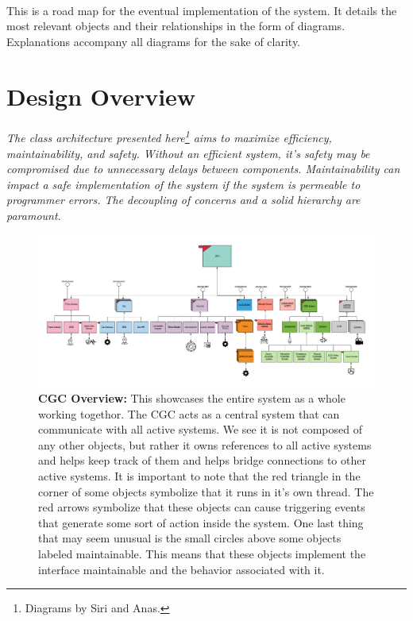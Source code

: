 \documentclass[12pt]{article}
\begin{document}
\paragraph{} This is a road map for the eventual implementation of the system. It details the most 
relevant objects and their relationships in the form of diagrams. Explanations accompany all diagrams 
for the sake of clarity.

\section{Design Overview} \label{over}
\paragraph{} \textit{The class architecture presented here\footnote{Diagrams by 
Siri and Anas.} aims to maximize efficiency, maintainability, and 
safety. Without an efficient system, it's safety may be compromised due to unnecessary 
delays between components. Maintainability can impact a safe implementation of the 
system if the system is permeable to programmer errors. The decoupling of concerns and 
a solid hierarchy are paramount.} 


\begin{figure}[H]
    \centerline{\includegraphics[scale=.095]{CGCOverview.png}}
    \caption{\textbf{CGC Overview:} This showcases the entire system as a whole working togethor. The CGC 
acts as a central system that can communicate with all active systems. We see it is not composed 
of any other objects, but rather it owns references to all active systems and helps keep track of 
them and helps bridge connections to other active systems. It is important to note that the red 
triangle in the corner of some objects symbolize that it runs in it's own thread. The red arrows 
symbolize that these objects can cause triggering events that generate some sort of action inside the 
system. One last thing that may seem unusual is the small circles above some objects labeled 
maintainable. This means that these objects implement the interface maintainable and the behavior 
associated with it.}
  \label{fig:CGCOverview}
\end{figure}    
\end{document}
